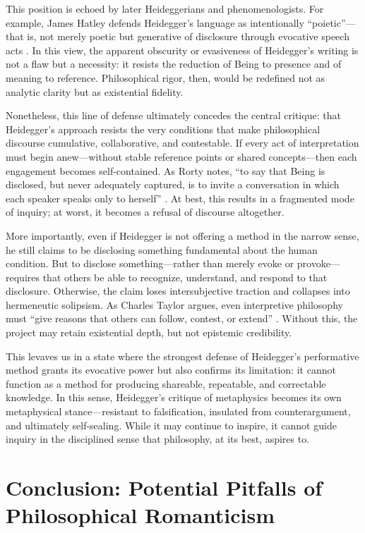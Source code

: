 \documentclass{article}
\begin{document}
This position is echoed by later Heideggerians and phenomenologists. For example, James Hatley defends Heidegger’s language as intentionally “poietic”—that is, not merely poetic but generative of disclosure through evocative speech acts \parencite[p.~108]{hatley2000}. In this view, the apparent obscurity or evasiveness of Heidegger's writing is not a flaw but a necessity: it resists the reduction of Being to presence and of meaning to reference. Philosophical rigor, then, would be redefined not as analytic clarity but as existential fidelity.

Nonetheless, this line of defense ultimately concedes the central critique: that Heidegger's approach resists the very conditions that make philosophical discourse cumulative, collaborative, and contestable. If every act of interpretation must begin anew—without stable reference points or shared concepts—then each engagement becomes self-contained. As Rorty notes, “to say that Being is disclosed, but never adequately captured, is to invite a conversation in which each speaker speaks only to herself” \parencite[p.~27]{rorty1991}. At best, this results in a fragmented mode of inquiry; at worst, it becomes a refusal of discourse altogether.

More importantly, even if Heidegger is not offering a method in the narrow sense, he still claims to be disclosing something fundamental about the human condition. But to disclose something—rather than merely evoke or provoke—requires that others be able to recognize, understand, and respond to that disclosure. Otherwise, the claim loses intersubjective traction and collapses into hermeneutic solipsism. As Charles Taylor argues, even interpretive philosophy must “give reasons that others can follow, contest, or extend” \parencite[p.~21]{taylor1985}. Without this, the project may retain existential depth, but not epistemic credibility.

This levaves us in a state where the strongest defense of Heidegger's performative method grants its evocative power but also confirms its limitation: it cannot function as a method for producing shareable, repeatable, and correctable knowledge. In this sense, Heidegger's critique of metaphysics becomes its own metaphysical stance—resistant to falsification, insulated from counterargument, and ultimately self-sealing. While it may continue to inspire, it cannot guide inquiry in the disciplined sense that philosophy, at its best, aspires to.

\section*{Conclusion: Potential Pitfalls of Philosophical Romanticism}
\end{document}
